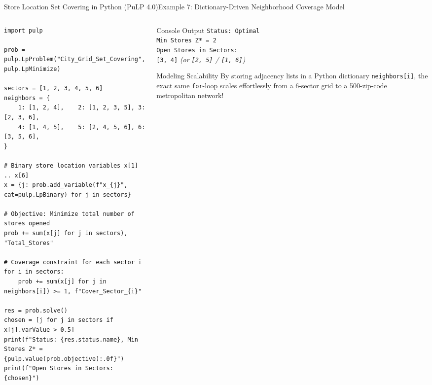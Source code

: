 \documentclass[aspectratio=169]{beamer}
\begin{document}
\begin{frame}[fragile]{Store Location Set Covering in Python (PuLP 4.0)}{Example 7: Dictionary-Driven Neighborhood Coverage Model}
\begin{columns}[T]
\begin{column}{0.58\textwidth}
\begin{lstlisting}
import pulp

prob = pulp.LpProblem("City_Grid_Set_Covering", pulp.LpMinimize)

sectors = [1, 2, 3, 4, 5, 6]
neighbors = {
    1: [1, 2, 4],    2: [1, 2, 3, 5], 3: [2, 3, 6],
    4: [1, 4, 5],    5: [2, 4, 5, 6], 6: [3, 5, 6],
}

# Binary store location variables x[1] .. x[6]
x = {j: prob.add_variable(f"x_{j}", cat=pulp.LpBinary) for j in sectors}

# Objective: Minimize total number of stores opened
prob += sum(x[j] for j in sectors), "Total_Stores"

# Coverage constraint for each sector i
for i in sectors:
    prob += sum(x[j] for j in neighbors[i]) >= 1, f"Cover_Sector_{i}"

res = prob.solve()
chosen = [j for j in sectors if x[j].varValue > 0.5]
print(f"Status: {res.status.name}, Min Stores Z* = {pulp.value(prob.objective):.0f}")
print(f"Open Stores in Sectors: {chosen}")
\end{lstlisting}
\end{column}
\begin{column}{0.39\textwidth}
\begin{block}{Console Output}
\footnotesize
\texttt{Status: Optimal}\\
\texttt{Min Stores Z* = 2}\\
\texttt{Open Stores in Sectors:}\\
\texttt{[3, 4]} \textit{(or \texttt{[2, 5]} / \texttt{[1, 6]})}
\end{block}
\begin{alertblock}{Modeling Scalability}
\scriptsize
By storing adjacency lists in a Python dictionary \texttt{neighbors[i]}, the exact same \texttt{for}-loop scales effortlessly from a 6-sector grid to a 500-zip-code metropolitan network!
\end{alertblock}
\end{column}
\end{columns}
\end{frame}
\end{document}

